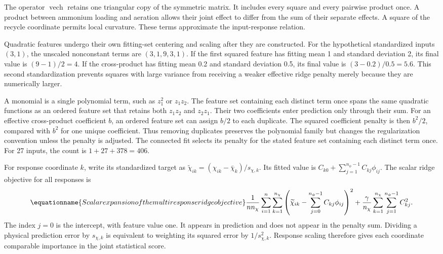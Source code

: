 The operator $\operatorname{vech}$ retains one triangular copy of the symmetric matrix. It includes every square and every pairwise product once. A product between ammonium loading and aeration allows their joint effect to differ from the sum of their separate effects. A square of the recycle coordinate permits local curvature. These terms approximate the input-response relation.

Quadratic features undergo their own fitting-set centering and scaling after they are constructed. For the hypothetical standardized inputs $(3,1)$, the unscaled nonconstant terms are $(3,1,9,3,1)$. If the first squared feature has fitting mean 1 and standard deviation 2, its final value is $(9-1)/2=4$. If the cross-product has fitting mean 0.2 and standard deviation 0.5, its final value is $(3-0.2)/0.5=5.6$. This second standardization prevents squares with large variance from receiving a weaker effective ridge penalty merely because they are numerically larger.

A monomial is a single polynomial term, such as $z_1^2$ or $z_1z_2$. The feature set containing each distinct term once spans the same quadratic functions as an ordered feature set that retains both $z_1z_2$ and $z_2z_1$. Their two coefficients enter prediction only through their sum. For an effective cross-product coefficient $b$, an ordered feature set can assign $b/2$ to each duplicate. The squared coefficient penalty is then $b^2/2$, compared with $b^2$ for one unique coefficient. Thus removing duplicates preserves the polynomial family but changes the regularization convention unless the penalty is adjusted. The connected fit selects its penalty for the stated feature set containing each distinct term once. For 27 inputs, the count is $1+27+378=406$.

For response coordinate $k$, write its standardized target as $\widetilde\chi_{ik}=(\chi_{ik}-\bar\chi_k)/s_{\chi,k}$. Its fitted value is $C_{k0}+\sum_{j=1}^{n_\phi-1}C_{kj}\phi_{ij}$. The scalar ridge objective for all responses is
\begin{equation}
\equationname{Scalar expansion of the multiresponse ridge objective}
\frac1{n n_\chi}\sum_{i=1}^{n}\sum_{k=1}^{n_\chi}
\left(\widetilde\chi_{ik}-\sum_{j=0}^{n_\phi-1}C_{kj}\phi_{ij}\right)^2
+\frac{\gamma}{n_\chi}\sum_{k=1}^{n_\chi}\sum_{j=1}^{n_\phi-1}C_{kj}^2.
\end{equation}
The index $j=0$ is the intercept, with feature value one. It appears in prediction and does not appear in the penalty sum. Dividing a physical prediction error by $s_{\chi,k}$ is equivalent to weighting its squared error by $1/s_{\chi,k}^2$. Response scaling therefore gives each coordinate comparable importance in the joint statistical score.

